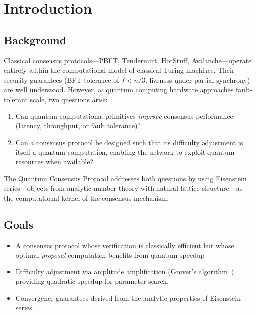 \section{Introduction}


\subsection{Background}

Classical consensus protocols---PBFT, Tendermint, HotStuff,
Avalanche---operate entirely within the computational model of
classical Turing machines. Their security guarantees (BFT tolerance
of $f < n/3$, liveness under partial synchrony) are well understood.
However, as quantum computing hardware approaches fault-tolerant
scale, two questions arise:

\begin{enumerate}[nosep]
  \item Can quantum computational primitives \emph{improve} consensus
        performance (latency, throughput, or fault tolerance)?
  \item Can a consensus protocol be designed such that its difficulty
        adjustment is itself a quantum computation, enabling the network
        to exploit quantum resources when available?
\end{enumerate}

The Quantum Consensus Protocol addresses both questions by using
Eisenstein series---objects from analytic number theory with natural
lattice structure---as the computational kernel of the consensus
mechanism.

\subsection{Goals}

\begin{itemize}[nosep]
  \item A consensus protocol whose verification is classically efficient
        but whose optimal \emph{proposal} computation benefits from
        quantum speedup.
  \item Difficulty adjustment via amplitude amplification (Grover's
        algorithm~\cite{grover1996}), providing quadratic speedup for
        parameter search.
  \item Convergence guarantees derived from the analytic properties of
        Eisenstein series.
\end{itemize}

